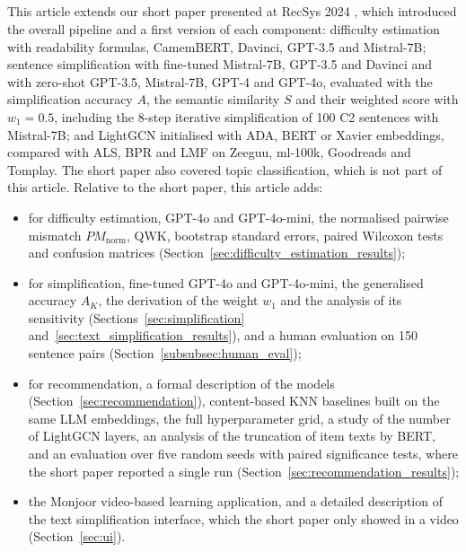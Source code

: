 \subsection*{}
\begin{mmblock}
This article extends our short paper presented at RecSys 2024 \cite{jamet2024evaluation}, which introduced the overall pipeline and a first version of each component: difficulty estimation with readability formulas, CamemBERT, Davinci, GPT-3.5 and Mistral-7B; sentence simplification with fine-tuned Mistral-7B, GPT-3.5 and Davinci and with zero-shot GPT-3.5, Mistral-7B, GPT-4 and GPT-4o, evaluated with the simplification accuracy $A$, the semantic similarity $S$ and their weighted score with $w_1 = 0.5$, including the 8-step iterative simplification of 100 C2 sentences with Mistral-7B; and LightGCN initialised with ADA, BERT or Xavier embeddings, compared with ALS, BPR and LMF on Zeeguu, ml-100k, Goodreads and Tomplay. The short paper also covered topic classification, which is not part of this article. Relative to the short paper, this article adds:
\begin{itemize}
    \item for difficulty estimation, GPT-4o and GPT-4o-mini, the normalised pairwise mismatch $PM_{\text{norm}}$, QWK, bootstrap standard errors, paired Wilcoxon tests and confusion matrices (Section~\ref{sec:difficulty_estimation_results});
    \item for simplification, fine-tuned GPT-4o and GPT-4o-mini, the generalised accuracy $A_K$, the derivation of the weight $w_1$ and the analysis of its sensitivity (Sections~\ref{sec:simplification} and~\ref{sec:text_simplification_results}), and a human evaluation on 150 sentence pairs (Section~\ref{subsubsec:human_eval});
    \item for recommendation, a formal description of the models (Section~\ref{sec:recommendation}), content-based KNN baselines built on the same LLM embeddings, the full hyperparameter grid, a study of the number of LightGCN layers, an analysis of the truncation of item texts by BERT, and an evaluation over five random seeds with paired significance tests, where the short paper reported a single run (Section~\ref{sec:recommendation_results});
    \item the Monjoor video-based learning application, and a detailed description of the text simplification interface, which the short paper only showed in a video (Section~\ref{sec:ui}).
\end{itemize}
\end{mmblock}

